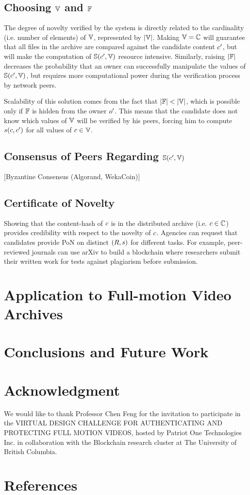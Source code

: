 \documentclass[conference]{IEEEtran}
\begin{document}
\subsection{Choosing ${\mathbb{V}}$ and ${\mathbb{F}}$}
The degree of novelty verified by the system is directly related to the cardinality (i.e. number of elements) of ${\mathbb{V}}$, represented by $\vert{\mathbb{V}}\vert$. Making ${\mathbb{V}} = {{\mathbb{C}}}$ will guarantee that all files in the archive are compared against the candidate content ${c}^\prime$, but will make the computation of ${\mathbb{S}}({c}^\prime, {\mathbb{V}})$ resource intensive. Similarly, raising $\vert{\mathbb{F}}\vert$ decreases the probability that an owner can successfully manipulate the values of ${\mathbb{S}}({c}^\prime, {\mathbb{V}})$, but requires more computational power during the verification process by network peers.

Scalability of this solution comes from the fact that $\vert{\mathbb{F}}\vert < \vert{\mathbb{V}}\vert$, which is possible only if ${\mathbb{F}}$ is hidden from the owner ${o}^\prime$. This means that the candidate does not know which values of ${\mathbb{V}}$ will be verified by his peers, forcing him to compute ${s}({c},{c}^\prime)$ for all values of ${c} \in {\mathbb{V}}$.
\subsection{Consensus of Peers Regarding ${\mathbb{S}}({c}^\prime, {\mathbb{V}})$}
[Byzantine Consensus (Algorand, WekaCoin)]
\subsection{Certificate of Novelty}
Showing that the content-hash of ${c}$ is in the distributed archive (i.e. ${c} \in {{\mathbb{C}}}$) provides credibility with respect to the novelty of ${c}$. Agencies can request that candidates provide PoN on distinct $(R, {s})$ for different tasks. For example, peer-reviewed journals can use arXiv to build a blockchain where researchers submit their written work for tests against plagiarism before submission.
\section{Application to Full-motion Video Archives}
\section{Conclusions and Future Work}
\section*{Acknowledgment}
We would like to thank Professor Chen Feng for the invitation to participate in the VIRTUAL DESIGN CHALLENGE FOR AUTHENTICATING  AND  PROTECTING  FULL  MOTION  VIDEOS, hosted by Patriot One Technologies Inc. in collaboration with the Blockchain research cluster at The University of British Columbia.
\section*{References}
\end{document}
